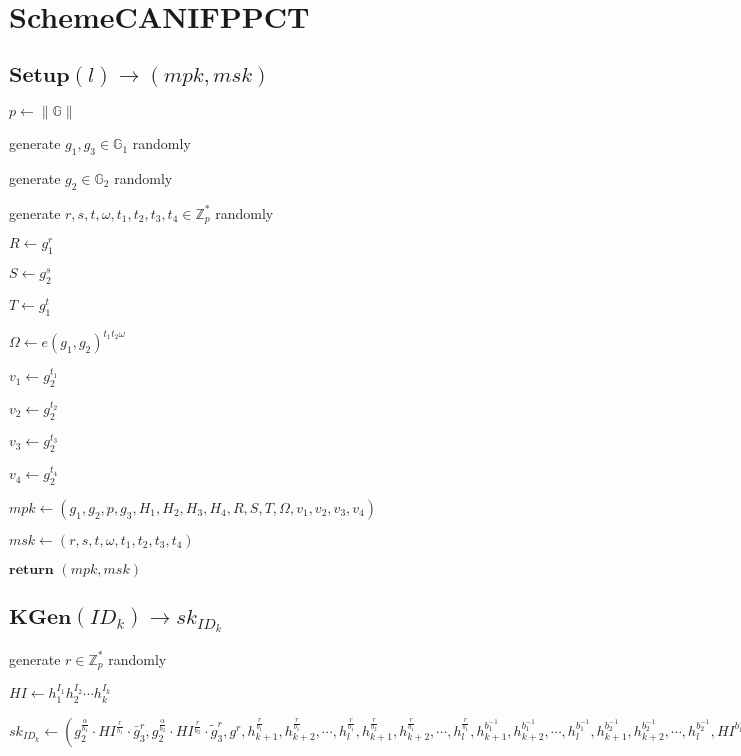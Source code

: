 \documentclass[a4paper]{article}
\begin{document}
\section{SchemeCANIFPPCT}

\subsection{$\textbf{Setup}(l) \rightarrow (\textit{mpk}, \textit{msk})$}

$p \gets \|\mathbb{G}\|$

generate $g_1, g_3 \in \mathbb{G}_1$ randomly

generate $g_2 \in \mathbb{G}_2$ randomly

generate $r, s, t, \omega, t_1, t_2, t_3, t_4 \in \mathbb{Z}_p^*$ randomly

$R \gets g_1^r$

$S \gets g_2^s$

$T \gets g_1^t$

$\Omega \gets e(g_1, g_2)^{t_1 t_2 \omega}$

$v_1 \gets g_2^{t_1}$

$v_2 \gets g_2^{t_2}$

$v_3 \gets g_2^{t_3}$

$v_4 \gets g_2^{t_4}$

$ \textit{mpk} \gets (g_1, g_2, p, g_3, H_1, H_2, H_3, H_4, R, S, T, \Omega, v_1, v_2, v_3, v_4)$

$\textit{msk} \gets (r, s, t, \omega, t_1, t_2, t_3, t_4)$

$\textbf{return }(\textit{mpk}, \textit{msk})$

\subsection{$\textbf{KGen}(\textit{ID}_k) \rightarrow \textit{sk}_{\textit{ID}_k}$}

generate $r \in \mathbb{Z}_p^*$ randomly

$\textit{HI} \gets h_1^{I_1}h_2^{I_2}\cdots h_k^{I_k}$

$\textit{sk}_{\textit{ID}_k} \gets (
g_2^{\frac{\alpha}{b_1}} \cdot \textit{HI}^{\frac{r}{b_1}} \cdot \bar{g}_3^r, 
g_2^{\frac{\alpha}{b_2}} \cdot \textit{HI}^{\frac{r}{b_2}} \cdot \tilde{g}_3^r, 
g^r, 
h_{k + 1}^{\frac{r}{b_1}}, h_{k + 2}^{\frac{r}{b_1}}, \cdots, h_l^{\frac{r}{b_1}}, 
h_{k + 1}^{\frac{r}{b_2}}, h_{k + 2}^{\frac{r}{b_1}}, \cdots, h_l^{\frac{r}{b_1}}, 
h_{k + 1}^{b_1^{-1}}, h_{k + 2}^{b_1^{-1}}, \cdots, h_l^{b_1^{-1}}, 
h_{k + 1}^{b_2^{-1}}, h_{k + 2}^{b_2^{-1}}, \cdots, h_l^{b_2^{-1}}, 
\textit{HI}^{b_1^{-1}}, \textit{HI}^{b_2^{-1}}
)$
\end{document}
